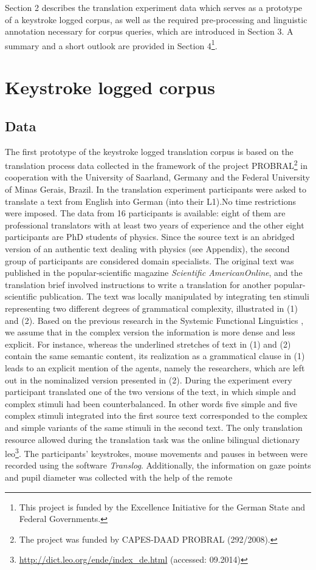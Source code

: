 \documentclass[output=paper]{LSP/langsci}
\begin{document}
Section 2 describes the translation experiment data which serves as a prototype of a keystroke logged corpus, as well as the required pre-processing and linguistic annotation necessary for corpus queries, which are introduced in Section 3. A summary and a short outlook are provided in Section 4\footnote{This project is funded by the Excellence Initiative for the German State and Federal Governments.}. 

\section{Keystroke logged corpus}
\subsection{Data}

The first prototype of the keystroke logged translation corpus is based on the translation process data collected in the framework of the project PROBRAL\footnote{The project was funded by CAPES-DAAD PROBRAL (292/2008).} in cooperation with the University of Saarland, Germany and the Federal University of Minas Gerais, Brazil. In the translation experiment participants were asked to translate a text from English into German (into their L1).No time restrictions were imposed. The data from 16 participants is available: eight of them are professional translators with at least two years of experience and the other eight participants are PhD students of physics. Since the source text is an abridged version of an authentic text dealing with physics (see Appendix), the second group of participants are considered domain specialists. The original text was published in the popular-scientific magazine \textit{Scientific AmericanOnline}, and the translation brief involved instructions to write a translation for another popular-scientific publication. The text was locally manipulated by integrating ten stimuli representing two different degrees of grammatical complexity, illustrated in (1) and (2). Based on the previous research in the Systemic Functional Linguistics \citep[see][715]{Halliday2014}, \citep[8-10]{Taverniers2003} we assume that in the complex version the information is more dense and less explicit. For instance, whereas the underlined stretches of text in (1) and (2) contain the same semantic content, its realization as a grammatical clause in (1) leads to an explicit mention of the agents, namely the researchers, which are left out in the nominalized version presented in (2). During the experiment every participant translated one of the two versions of the text, in which simple and complex stimuli had been counterbalanced. In other words five simple and five complex stimuli integrated into the first source text corresponded to the complex and simple variants of the same stimuli in the second text. The only translation resource allowed during the translation task was the online bilingual dictionary leo\footnote{\url{http://dict.leo.org/ende/index_de.html} (accessed: 09.2014)}. The participants’ keystrokes, mouse movements and pauses in between were recorded using the software \textit{Translog}. Additionally, the information on gaze points and pupil diameter was collected with the help of the remote 
\end{document}

